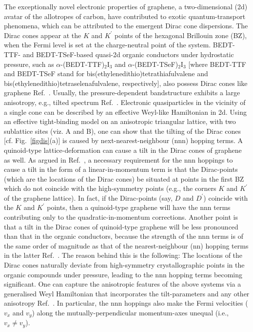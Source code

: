\documentclass[aps,prb, onecolumn, nofootinbib, citeautoscript,10pt]{revtex4-2}
\newcommand{\red}[1]{{\color{red}#1}}
\begin{document}
The exceptionally novel electronic properties of graphene, a two-dimensional (2d) avatar of the allotropes of carbon, have contributed to exotic quantum-transport phenomena, which can be attributed to the emergent Dirac cone dispersions. The Dirac cones appear at the $K$ and $K^\prime $ points of the hexagonal Brillouin zone (BZ), when the Fermi level is set at the charge-neutral point of the system. BEDT-TTF- and BEDT-TSeF-based quasi-2d organic conductors under hydrostatic pressure, such as $\alpha$-(BEDT-TTF)$_2$I$_3$ and $\alpha$-(BEDT-TSeF)$_2$I$_3$ [where BEDT-TTF and BEDT-TSeF stand for bis(ethylenedithio)tetrathiafulvalene and bis(\red{ethylenedithio)tetraselenafulvalene}, respectively], also possess Dirac cones like graphene Ref.~\cite{organic-tilted-dirac, organic-dirac}. Usually, the pressure-dependent bandstructure exhibits a large anisotropy, e.g., tilted spectrum Ref.~\cite{organic-tilted-dirac}. Electronic quasiparticles in the vicinity of a single cone can be described by an effective Weyl-like Hamiltonian in 2d. Using an effective tight-binding model on an anisotropic triangular lattice, with two sublattice sites (viz. A and B), one can show that the tilting of the Dirac cones [cf. Fig.~\ref{figdis}(a)] is caused by next-nearest-neighbour (nnn) hopping terms. A quinoid-type lattice-deformation can cause a tilt in the Dirac cones of graphene as well. As argued in Ref.~\cite{tilted-goerbig}, a necessary requirement for the nnn hoppings to cause a tilt in the form of a linear-in-momentum term is that the Dirac-points (which are the locations of the Dirac cones) be situated at points in the first BZ which do not coincide with the high-symmetry points (e.g., the corners $K$ and $K^\prime$ of the graphene lattice). In fact, if the Dirac-points (say, $D$ and $D^\prime $) coincide with the $K$ and $K^\prime$ points, then a quinoid-type graphene will have the nnn terms contributing only \red{to} the quadratic-in-momentum corrections.
Another point is that a tilt in the Dirac cones of quinoid-type graphene will be less pronounced than that in the organic conductors, because the strength of the nnn terms is of the same order of magnitude as that of the nearest-\red{neighbour} (nn) hopping terms in the latter Ref.~\cite{tilted-goerbig}. The reason behind this is the following: The locations of the Dirac cones naturally deviate from high-symmetry crystallographic points in the organic compounds under pressure, leading to the nnn hopping terms becoming significant. One can capture the anisotropic features of the above systems via a \red{generalised} Weyl Hamiltonian that incorporates the tilt-parameters and any other anisotropy Ref.~\cite{tilted-goerbig-plasmons, strained-dirac-franz, ips_tilted_dirac}. In particular, the nnn hoppings also make the Fermi velocities ($v_x $ and $ v_y$) along the mutually-perpendicular momentum-axes \red{unequal} (i.e., $ v_x \neq v_y$).
\end{document}
